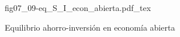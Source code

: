 \begin{figure}[h]
\centering
\def\svgwidth{0.5\textwidth}
{fig07_09-eq_S_I_econ_abierta.pdf_tex}
\caption{Equilibrio ahorro-inversión en economía abierta}
\label{fig07_09-eq_S_I_econ_abierta}
\end{figure}